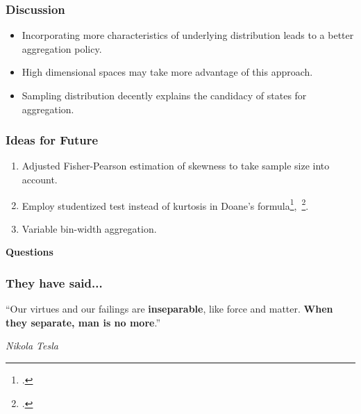 \documentclass[mathserif]{beamer}
\begin{document}
    \begin{frame}
        \frametitle{Discussion}

        \begin{itemize}
            \item Incorporating more characteristics of underlying distribution leads to a better aggregation policy.
            \item High dimensional spaces may take more advantage of this approach.
            \item Sampling distribution decently explains the candidacy of states for aggregation.
        \end{itemize}
    \end{frame}


    \begin{frame}
        \frametitle{Ideas for Future}
        \begin{enumerate}
            \item Adjusted Fisher-Pearson estimation of skewness to take sample size into
            account.
            \item Employ studentized test instead of kurtosis in Doane's formula\footcite{Geary1936},~\footcite{Tracy2005}.
            \item Variable bin-width aggregation.
        \end{enumerate}
    \end{frame}


    \begin{frame}
        \Huge \textbf{Questions}
    \end{frame}

    \begin{frame}
        \frametitle{They have said...}

        \Huge{``Our virtues and our failings are \textbf{inseparable}, like force and matter. \textbf{When they
        separate, man is no more}.''}

        \hfill \LARGE{\textit{Nikola Tesla}}
    \end{frame}


    \begin{frame}[allowframebreaks]
        \printbibliography
    \end{frame}
\end{document}
